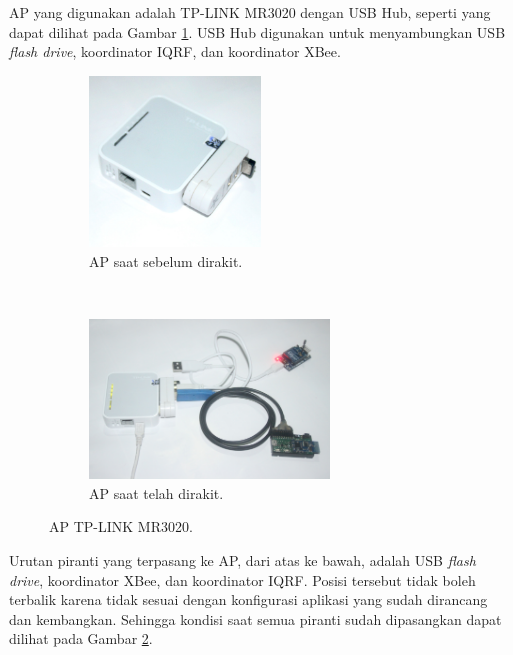 			AP yang digunakan adalah TP-LINK MR3020 dengan USB Hub, seperti yang dapat dilihat pada Gambar \ref{ap-stripped}. USB Hub digunakan untuk menyambungkan USB \emph{flash drive}, koordinator IQRF, dan koordinator XBee.

			\begin{figure}[H]
				\begin{subfigure}[b]{\textwidth}
					\centering
				    \includegraphics[width=0.5\textwidth]{gambar/ap-stripped}
				    \caption{AP saat sebelum dirakit.}
				    \label{ap-stripped}
				\end{subfigure}
				 ~
				\begin{subfigure}[b]{\textwidth}
					\centering
				    \includegraphics[width=0.7\textwidth]{gambar/ap-complete}
				    \caption{AP saat telah dirakit.}
				    \label{ap-complete}
				\end{subfigure}
				\caption{AP TP-LINK MR3020.}
				\label{ap}
			\end{figure}

			Urutan piranti yang terpasang ke AP, dari atas ke bawah, adalah USB \emph{flash drive}, koordinator XBee, dan koordinator IQRF. Posisi tersebut tidak boleh terbalik karena tidak sesuai dengan konfigurasi aplikasi yang sudah dirancang dan kembangkan. Sehingga kondisi saat semua piranti sudah dipasangkan dapat dilihat pada Gambar \ref{ap-complete}.

